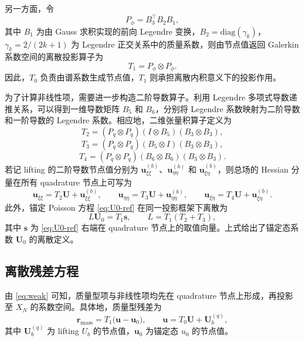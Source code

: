 \documentclass[11pt,a4paper]{article}
\begin{document}
另一方面，令
\begin{equation}
P_\phi=B_3^\top B_2B_1,
\label{eq:Pphi}
\end{equation}
其中 $B_1$ 为由 Gauss 求积实现的前向 Legendre 变换，$B_2=\mathrm{diag}(\gamma_k)$，$\gamma_k=2/(2k+1)$ 为 Legendre 正交关系中的质量系数，则由节点值返回 Galerkin 系数空间的离散投影算子为
\begin{equation}
T_1=P_\phi\otimes P_\phi.
\label{eq:T1}
\end{equation}
因此，$T_0$ 负责由谱系数生成节点值，$T_1$ 则承担离散内积意义下的投影作用。

为了计算非线性项，需要进一步构造二阶导数算子。利用 Legendre 多项式导数递推关系，可以得到一维导数矩阵 $B_5$ 和 $B_6$，分别将 Legendre 系数映射为二阶导数和一阶导数的 Legendre 系数。相应地，二维张量积算子定义为
\begin{equation}
T_2=(P_q\otimes P_q)(I\otimes B_5)(B_3\otimes B_3),
\label{eq:T2}
\end{equation}
\begin{equation}
T_3=(P_q\otimes P_q)(B_5\otimes I)(B_3\otimes B_3),
\label{eq:T3}
\end{equation}
\begin{equation}
T_4=(P_q\otimes P_q)(B_6\otimes B_6)(B_3\otimes B_3).
\label{eq:T4}
\end{equation}
若记 lifting 的二阶导数节点值分别为 $\bm u^{(b)}_{\xi\xi}$、$\bm u^{(b)}_{\eta\eta}$ 和 $\bm u^{(b)}_{\xi\eta}$，则总场的 Hessian 分量在所有 quadrature 节点上可写为
\begin{equation}
\bm u_{\xi\xi}=T_2\bm U+\bm u^{(b)}_{\xi\xi},
\qquad
\bm u_{\eta\eta}=T_3\bm U+\bm u^{(b)}_{\eta\eta},
\qquad
\bm u_{\xi\eta}=T_4\bm U+\bm u^{(b)}_{\xi\eta}.
\label{eq:hessian-discrete}
\end{equation}
此外，锚定 Poisson 方程 \eqref{eq:U0-ref} 在同一投影框架下离散为
\begin{equation}
L\bm U_0=T_1\bm s,
\qquad
L=T_1(T_2+T_3),
\label{eq:anchor-discrete}
\end{equation}
其中 $\bm s$ 为 \eqref{eq:U0-ref} 右端在 quadrature 节点上的取值向量。上式给出了锚定态系数 $\bm U_0$ 的离散定义。

\subsection{离散残差方程}
由 \eqref{eq:weak} 可知，质量型项与非线性项均先在 quadrature 节点上形成，再投影至 $X_N$ 的系数空间。具体地，质量型残差为
\begin{equation}
\bm r_{\mathrm{mass}}
=
T_1\bigl(\bm u-\bm u_0\bigr),
\qquad
\bm u=T_0\bm U+\bm U_b^{(q)},
\label{eq:mass-residual}
\end{equation}
其中 $\bm U_b^{(q)}$ 为 lifting $U_b$ 的节点值，$\bm u_0$ 为锚定态 $u_0$ 的节点值。
\end{document}
